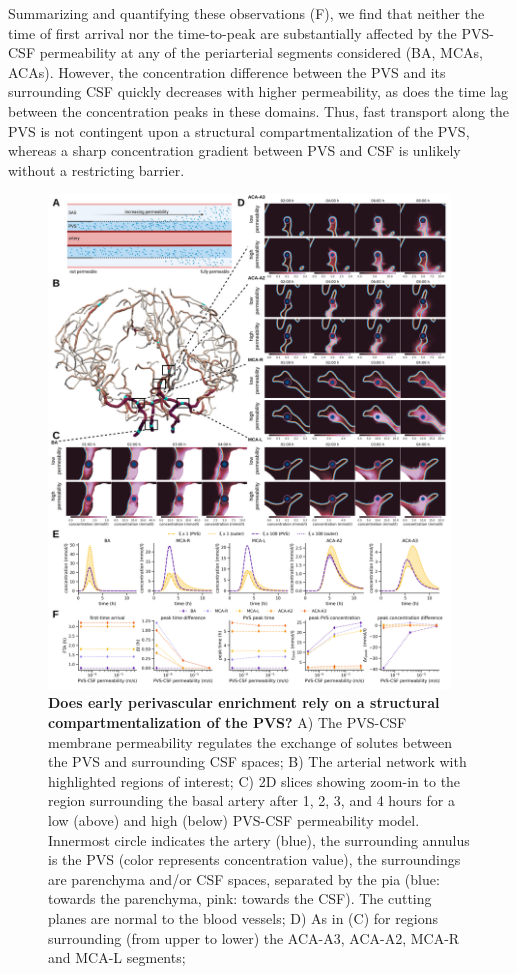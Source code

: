 \documentclass[fleqn,10pt]{wlscirep}
\begin{document}
Summarizing and quantifying these observations
(F), we find that neither the time of
first arrival nor the time-to-peak are substantially affected by the
PVS-CSF permeability at any of the periarterial segments considered
(BA, MCAs, ACAs). However, the concentration difference between the
PVS and its surrounding CSF quickly decreases with higher
permeability, as does the time lag between the concentration peaks in
these domains. Thus, fast transport along the PVS is not contingent
upon a structural compartmentalization of the PVS, whereas a sharp
concentration gradient between PVS and CSF is unlikely without a
restricting barrier.
\begin{figure}
    \centering
    \includegraphics[width=0.95\textwidth]{figures/figure4.png}
    \caption{\textbf{Does early perivascular enrichment rely on a structural compartmentalization of the PVS?}
    A) The PVS-CSF membrane permeability regulates the exchange of solutes between the PVS and surrounding CSF spaces; 
    B) The arterial network with highlighted regions of interest; 
    C) 2D slices showing zoom-in to the region surrounding the basal artery after 1, 2, 3, and 4 hours for a low (above) and high (below) PVS-CSF permeability model. Innermost circle indicates the artery (blue), the surrounding annulus is the PVS (color represents concentration value), the surroundings are parenchyma and/or CSF spaces, separated by the pia (blue: towards the parenchyma, pink: towards the CSF). The cutting planes are normal to the blood vessels;
    D) As in (C) for regions surrounding (from upper to lower) the ACA-A3, ACA-A2, MCA-R and MCA-L segments;}
    \label{fig:compartmentalization}
\end{figure}
\end{document}
